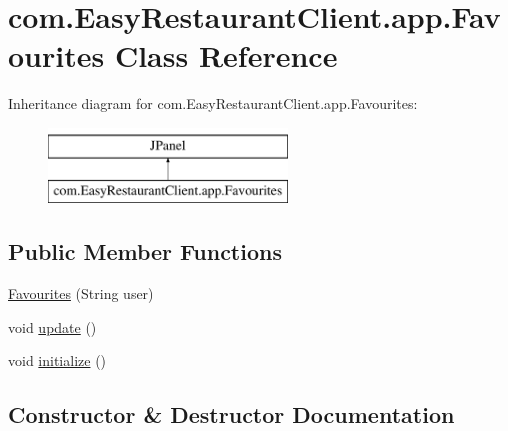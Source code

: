 \hypertarget{classcom_1_1_easy_restaurant_client_1_1app_1_1_favourites}{}\section{com.\+Easy\+Restaurant\+Client.\+app.\+Favourites Class Reference}
\label{classcom_1_1_easy_restaurant_client_1_1app_1_1_favourites}
Inheritance diagram for com.\+Easy\+Restaurant\+Client.\+app.\+Favourites\+:\begin{figure}[H]
\begin{center}
\leavevmode
\includegraphics[height=2.000000cm]{classcom_1_1_easy_restaurant_client_1_1app_1_1_favourites}
\end{center}
\end{figure}
\subsection*{Public Member Functions}
\begin{DoxyCompactItemize}
\item 
\mbox{\hyperlink{classcom_1_1_easy_restaurant_client_1_1app_1_1_favourites_a6131a316167cba4fdc6cffe49f245bc0}{Favourites}} (String user)
\item 
void \mbox{\hyperlink{classcom_1_1_easy_restaurant_client_1_1app_1_1_favourites_acc2a4c2c279d0cd13334f273bbb4c1a3}{update}} ()
\item 
void \mbox{\hyperlink{classcom_1_1_easy_restaurant_client_1_1app_1_1_favourites_a96b0ed36fe7d35f9f9e98d353ea832de}{initialize}} ()
\end{DoxyCompactItemize}


\subsection{Constructor \& Destructor Documentation}
\mbox{\label{classcom_1_1_easy_restaurant_client_1_1app_1_1_favourites_a6131a316167cba4fdc6cffe49f245bc0}} 
